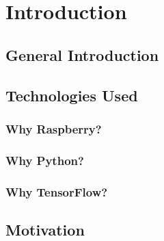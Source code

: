 \chapter{Introduction}
\label{introduction}

\section{General Introduction}	%
\section{Technologies Used}	%
\subsection{Why Raspberry?}
\subsection{Why Python?}
\subsection{Why TensorFlow?}
\section{Motivation}
